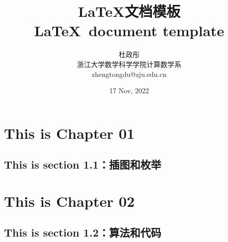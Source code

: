 \documentclass[a4paper,oneside]{report}
\begin{document}
\begin{CJK*}{UTF8}{gkai}
\CJKindent
\makeatletter %
\def\@cite#1#2{\textsuperscript{[{#1\if@tempswa , #2\fi}]}}
\makeatother
\newtheorem{theorem}{{定理}}
\newtheorem{remark}{{注}}
\newtheorem{proposition}[theorem]{{命题}}
\newtheorem{lemma}[theorem]{{引理}}
\newtheorem{corollary}[theorem]{{推论}}
\newtheorem{definition}[theorem]{{定义}}
\newtheorem{question}[theorem]{{问题}}

\renewcommand{\bibname}{\centerline{参考文献}}
\renewcommand{\tablename}{表}
\renewcommand{\figurename}{图}


\title{\LaTeX 文档模板 \\ \LaTeX\ document template}
\author{杜政彤 \\ 浙江大学数学科学学院计算数学系 \\ zhengtongdu@zju.edu.cn}
\date{17 Nov, 2022}

\maketitle




\tableofcontents
\clearpage

\pagestyle{fancy}
\fancyhead{}

\chead{}


\chapter{This is Chapter 01}

\section{This is section 1.1：插图和枚举}
\label{sec:1.1}


\chapter{This is Chapter 02}
\section{This is section 1.2：算法和代码}
\label{sec:reuse}



{\footnotesize


}


\end{CJK*}
\end{document}
